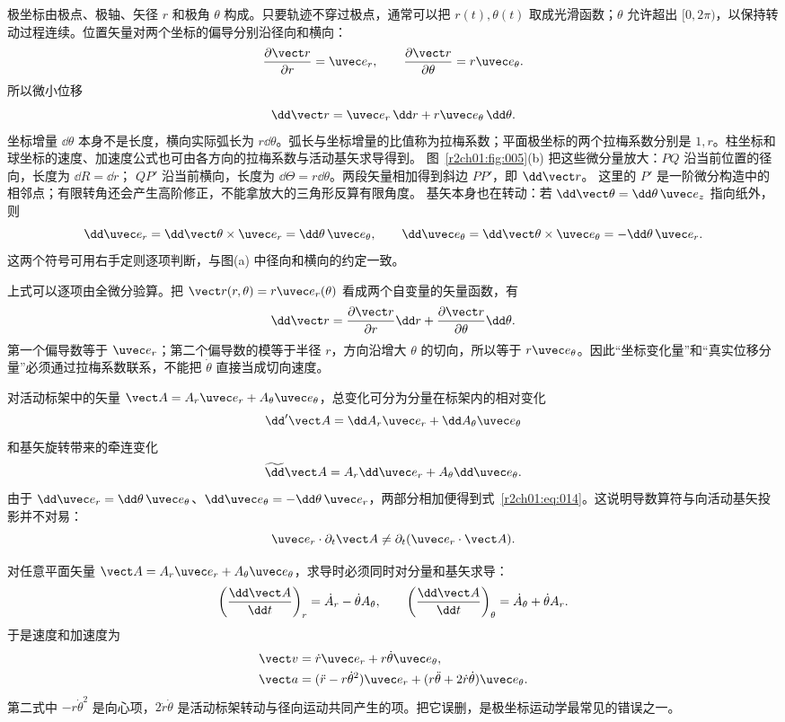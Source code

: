 \figPolarFrame

极坐标由极点、极轴、矢径 $r$ 和极角 $\theta$ 构成。只要轨迹不穿过极点，通常可以把 $r(t),\theta(t)$ 取成光滑函数；$\theta$ 允许超出 $[0,2\pi)$，以保持转动过程连续。位置矢量对两个坐标的偏导分别沿径向和横向：
\[
  \frac{\partial\vect r}{\partial r}=\uvec e_r,\qquad
  \frac{\partial\vect r}{\partial\theta}=r\uvec e_\theta.
\]
所以微小位移
\[
  \dd\vect r=\uvec e_r\,\dd r+r\uvec e_\theta\,\dd\theta.
\]
坐标增量 $\dd\theta$ 本身不是长度，横向实际弧长为 $r\dd\theta$。弧长与坐标增量的比值称为拉梅系数；平面极坐标的两个拉梅系数分别是 $1,r$。柱坐标和球坐标的速度、加速度公式也可由各方向的拉梅系数与活动基矢求导得到。
图~\ref{r2ch01:fig:005}(b) 把这些微分量放大：$PQ$ 沿当前位置的径向，长度为 $\dd R=\dd r$；
$QP'$ 沿当前横向，长度为 $\dd\Theta=r\dd\theta$。两段矢量相加得到斜边 $PP'$，即 $\dd\vect r$。
这里的 $P'$ 是一阶微分构造中的相邻点；有限转角还会产生高阶修正，不能拿放大的三角形反算有限角度。
基矢本身也在转动：若 $\dd\vect\theta=\dd\theta\,\uvec e_z$ 指向纸外，则
\[
 \dd\uvec e_r=\dd\vect\theta\times\uvec e_r=\dd\theta\,\uvec e_\theta,
 \qquad
 \dd\uvec e_\theta=\dd\vect\theta\times\uvec e_\theta=-\dd\theta\,\uvec e_r.
\]
这两个符号可用右手定则逐项判断，与图(a) 中径向和横向的约定一致。

上式可以逐项由全微分验算。把 $\vect r(r,\theta)=r\uvec e_r(\theta)$ 看成两个自变量的矢量函数，有
\[
  \dd\vect r=\frac{\partial\vect r}{\partial r}\dd r
  +\frac{\partial\vect r}{\partial\theta}\dd\theta.
\]
第一个偏导数等于 $\uvec e_r$；第二个偏导数的模等于半径 $r$，方向沿增大 $\theta$ 的切向，所以等于 $r\uvec e_\theta$。因此“坐标变化量”和“真实位移分量”必须通过拉梅系数联系，不能把 $\dot\theta$ 直接当成切向速度。

对活动标架中的矢量 $\vect A=A_r\uvec e_r+A_\theta\uvec e_\theta$，总变化可分为分量在标架内的相对变化
\[
  \dd'\vect A=\dd A_r\uvec e_r+\dd A_\theta\uvec e_\theta
\]
和基矢旋转带来的牵连变化
\[
  \widetilde{\dd}\vect A=A_r\dd\uvec e_r+A_\theta\dd\uvec e_\theta.
\]
由于 $\dd\uvec e_r=\dd\theta\,\uvec e_\theta$、$\dd\uvec e_\theta=-\dd\theta\,\uvec e_r$，两部分相加便得到式~\eqref{r2ch01:eq:014}。这说明导数算符与向活动基矢投影并不对易：
\[
  \uvec e_r\cdot\partial_t\vect A\ne
  \partial_t(\uvec e_r\cdot\vect A).
\]

对任意平面矢量 $\vect A=A_r\uvec e_r+A_\theta\uvec e_\theta$，求导时必须同时对分量和基矢求导：
\begin{equation}
  \left(\frac{\dd\vect A}{\dd t}\right)_r=\dot A_r-\dot\theta A_\theta,\qquad
  \left(\frac{\dd\vect A}{\dd t}\right)_\theta=\dot A_\theta+\dot\theta A_r.
  \label{r2ch01:eq:014}
\end{equation}
于是速度和加速度为
\begin{align}
  \vect v&=\dot r\uvec e_r+r\dot\theta\uvec e_\theta,\label{r2ch01:eq:015}\\
  \vect a&=(\ddot r-r\dot\theta^2)\uvec e_r
  +(r\ddot\theta+2\dot r\dot\theta)\uvec e_\theta.\label{r2ch01:eq:016}
\end{align}
第二式中 $-r\dot\theta^2$ 是向心项，$2\dot r\dot\theta$ 是活动标架转动与径向运动共同产生的项。把它误删，是极坐标运动学最常见的错误之一。

